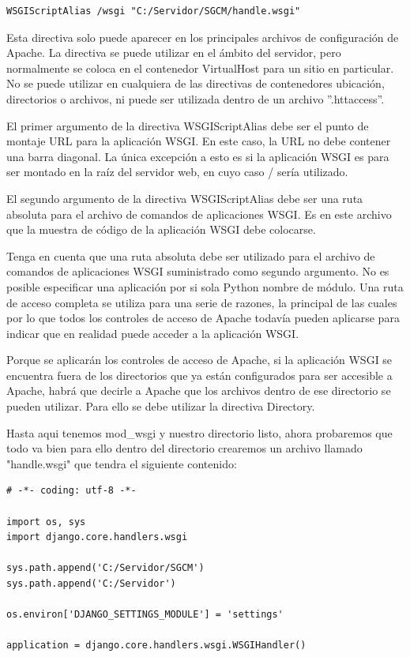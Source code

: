 \begin{lstlisting}[style=consola]
WSGIScriptAlias /wsgi "C:/Servidor/SGCM/handle.wsgi" 
\end{lstlisting}
\vspace{0.1cm}

Esta directiva solo puede aparecer en los principales archivos de configuración de Apache. La directiva se puede utilizar en el ámbito del servidor, pero normalmente se coloca en el contenedor VirtualHost para un sitio en particular. No se puede utilizar en cualquiera de las directivas de contenedores ubicación, directorios o archivos, ni puede ser utilizada dentro de un archivo ''.httaccess''.

El primer argumento de la directiva WSGIScriptAlias debe ser el punto de montaje URL para la aplicación WSGI. En este caso, la URL no debe contener una barra diagonal. La única excepción a esto es si la aplicación WSGI es para ser montado en la raíz del servidor web, en cuyo caso / sería utilizado.

El segundo argumento de la directiva WSGIScriptAlias debe ser una ruta absoluta para el archivo de comandos de aplicaciones WSGI. Es en este archivo que la muestra de código de la aplicación WSGI debe colocarse.

Tenga en cuenta que una ruta absoluta debe ser utilizado para el archivo de comandos de aplicaciones WSGI suministrado como segundo argumento. No es posible especificar una aplicación por si  sola Python nombre de módulo. Una ruta de acceso completa se utiliza para una serie de razones, la principal de las cuales por lo que todos los controles de acceso de Apache todavía pueden aplicarse para indicar que en realidad puede acceder a la aplicación WSGI.

Porque se aplicarán los controles de acceso de Apache, si la aplicación WSGI se  encuentra fuera de los directorios que ya están configurados para ser accesible a Apache, habrá que decirle a Apache que los archivos dentro de ese directorio se   pueden utilizar. Para ello se debe utilizar la directiva Directory.

Hasta aqui tenemos mod\_wsgi y nuestro directorio listo, ahora probaremos que todo va bien para ello dentro del directorio crearemos un archivo llamado "handle.wsgi" que tendra el siguiente contenido:

\begin{lstlisting}[style=Python]
# -*- coding: utf-8 -*-

import os, sys
import django.core.handlers.wsgi

sys.path.append('C:/Servidor/SGCM')
sys.path.append('C:/Servidor')

os.environ['DJANGO_SETTINGS_MODULE'] = 'settings'

application = django.core.handlers.wsgi.WSGIHandler()

\end{lstlisting}
\vspace{0.1cm}


